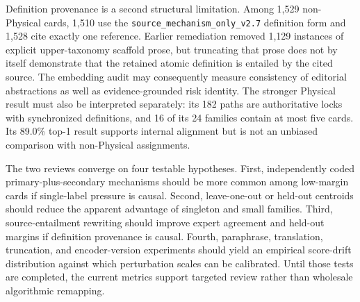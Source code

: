 \documentclass[11pt,a4paper]{article}
\begin{document}
Definition provenance is a second structural limitation. Among 1,529
non-Physical cards, 1,510 use the
\nolinkurl{source_mechanism_only_v2.7} definition
form and 1,528 cite exactly one reference. Earlier remediation removed 1,129
instances of explicit upper-taxonomy scaffold prose, but truncating that prose
does not by itself demonstrate that the retained atomic definition is entailed
by the cited source. The embedding audit may consequently measure consistency
of editorial abstractions as well as evidence-grounded risk identity. The
stronger Physical result must also be interpreted separately: its 182 paths
are authoritative locks with synchronized definitions, and 16 of its 24
families contain at most five cards. Its 89.0\% top-1 result supports internal
alignment but is not an unbiased comparison with non-Physical assignments.

The two reviews converge on four testable hypotheses. First, independently
coded primary-plus-secondary mechanisms should be more common among low-margin
cards if single-label pressure is causal. Second, leave-one-out or held-out
centroids should reduce the apparent advantage of singleton and small
families. Third, source-entailment rewriting should improve expert agreement
and held-out margins if definition provenance is causal. Fourth, paraphrase,
translation, truncation, and encoder-version experiments should yield an
empirical score-drift distribution against which perturbation scales can be
calibrated. Until those tests are completed, the current metrics support
targeted review rather than wholesale algorithmic remapping.
\end{document}
